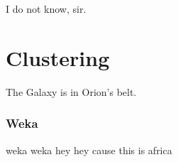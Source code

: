 I do not know, sir.

\section{Clustering}

The Galaxy is in Orion's belt.

\subsubsection{Weka}

weka weka hey hey cause this is africa

